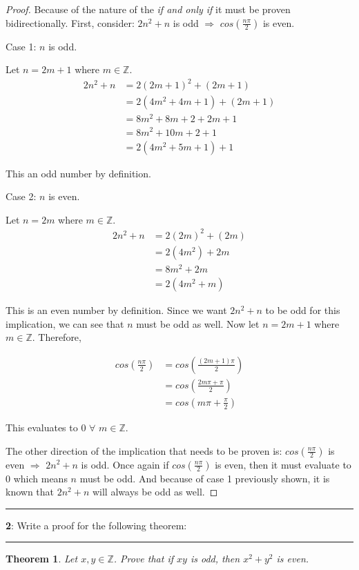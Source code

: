 \documentclass[11pt]{article}
\newtheorem{theorem}{Theorem}
\newcommand\question[2]{\vspace{.25in}\hrule\textbf{#1}: #2\vspace{.5em}\hrule\vspace{.10in}}
\newcommand{\Z}{\mathbb{Z}}
\begin{document}
\begin{proof}
	Because of the nature of the \textit{if and only if} it must be proven bidirectionally. First, consider: $2n^2+n$ is odd $\Rightarrow$ $cos(\frac{n \pi}{2})$ is even.

	Case 1: $n$ is odd.

	Let $n=2m+1$ where $m \in \Z$.
	\begin{align*}
		2n^2+n &= 2(2m+1)^2 + (2m+1)\\
		&= 2(4m^2+4m+1) + (2m+1)\\
		&= 8m^2+8m+2+2m+1\\
		&= 8m^2+10m+2+1\\
		&= 2(4m^2+5m+1) + 1
	\end{align*}

	This an odd number by definition.

	Case 2: $n$ is even.

	Let $n=2m$ where $m \in \Z$.
	\begin{align*}
		2n^2+n &= 2(2m)^2 + (2m)\\
		&= 2(4m^2)+2m\\
		&= 8m^2+2m\\
		&= 2(4m^2+m)
	\end{align*}

	This is an even number by definition. Since we want $2n^2+n$ to be odd for this implication, we can see that $n$ must be odd as well. Now let $n = 2m+1$ where $m \in \Z$. Therefore, 

	\begin{align*}
		cos(\frac{n\pi}{2}) &= cos(\frac{(2m+1)\pi}{2})\\
		&= cos(\frac{2m\pi + \pi}{2})\\
		&= cos(m\pi + \frac{\pi}{2})
	\end{align*}

	This evaluates to 0 $\forall$ $m \in \Z$.

	The other direction of the implication that needs to be proven is: $cos(\frac{n\pi}{2})$ is even $\Rightarrow$ $2n^2+n$ is odd. Once again if $cos(\frac{n\pi}{2})$ is even, then it must evaluate to 0 which means $n$ must be odd. And because of case 1 previously shown, it is known that $2n^2+n$ will always be odd as well.
\end{proof}

\pagebreak 
\question{2}{Write a proof for the following theorem:}

\begin{theorem}
	Let $x,y \in \Z$. Prove that if $xy$ is odd, then $x^2 + y^2$ is even.
\end{theorem}
\end{document}
